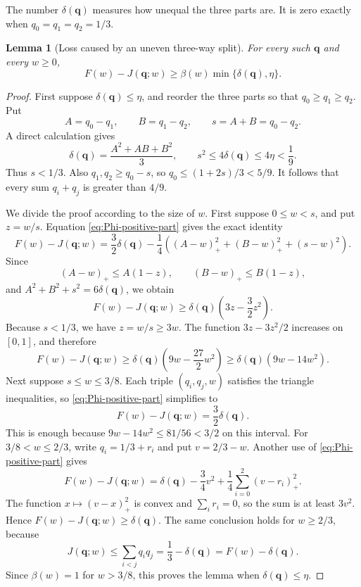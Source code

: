 \documentclass[11pt]{article}
\numberwithin{equation}{section}
\newtheorem{lemma}[lemma]{Lemma}
\theoremstyle{remark}
\begin{document}
The number $\delta(\mathbf q)$ measures how unequal the three parts are.  It is
zero exactly when $q_0=q_1=q_2=1/3$.
\begin{lemma}[Loss caused by an uneven three-way split]
\label{lem:uneven-three-split}
For every such $\mathbf q$ and every $w\ge0$,
\begin{equation}\label{eq:uneven-three-split}
 F(w)-J(\mathbf q;w)
 \ge \beta(w)\min\{\delta(\mathbf q),\eta\}.
\end{equation}
\end{lemma}
\begin{proof}
First suppose $\delta(\mathbf q)\le\eta$, and reorder the three parts so that
$q_0\ge q_1\ge q_2$.  Put
\[
 A=q_0-q_1,
 \qquad B=q_1-q_2,
 \qquad s=A+B=q_0-q_2.
\]
A direct calculation gives
\begin{equation}\label{eq:delta-AB}
 \delta(\mathbf q)=\frac{A^2+AB+B^2}{3},
 \qquad
 s^2\le4\delta(\mathbf q)\le4\eta<\frac19.
\end{equation}
Thus $s<1/3$.  Also $q_1,q_2\ge q_0-s$, so
$q_0\le(1+2s)/3<5/9$.  It follows that every sum $q_i+q_j$ is greater
than $4/9$.

We divide the proof according to the size of $w$.  First suppose
$0\le w<s$, and put $z=w/s$.  Equation
\eqref{eq:Phi-positive-part} gives the exact identity
\begin{equation}\label{eq:small-w-exact}
 F(w)-J(\mathbf q;w)
 =\frac32\delta(\mathbf q)
 -\frac14\left((A-w)_+^2+(B-w)_+^2+(s-w)^2\right).
\end{equation}
Since
\[
 (A-w)_+\le A(1-z),
 \qquad
 (B-w)_+\le B(1-z),
\]
and $A^2+B^2+s^2=6\delta(\mathbf q)$, we obtain
\[
 F(w)-J(\mathbf q;w)
 \ge\delta(\mathbf q)\left(3z-\frac32z^2\right).
\]
Because $s<1/3$, we have $z=w/s\ge3w$.  The function
$3z-3z^2/2$ increases on $[0,1]$, and therefore
\[
 F(w)-J(\mathbf q;w)
 \ge\delta(\mathbf q)\left(9w-\frac{27}{2}w^2\right)
 \ge\delta(\mathbf q)(9w-14w^2).
\]
Next suppose $s\le w\le3/8$.  Each triple $(q_i,q_j,w)$ satisfies the
triangle inequalities, so \eqref{eq:Phi-positive-part} simplifies to
\begin{equation}\label{eq:middle-w-three}
 F(w)-J(\mathbf q;w)=\frac32\delta(\mathbf q).
\end{equation}
This is enough because $9w-14w^2\le81/56<3/2$ on this interval.
For $3/8<w\le2/3$, write $q_i=1/3+r_i$ and put $v=2/3-w$.
Another use of \eqref{eq:Phi-positive-part} gives
\begin{equation}\label{eq:large-w-three}
 F(w)-J(\mathbf q;w)
 =\delta(\mathbf q)-\frac34v^2
 +\frac14\sum_{i=0}^2(v-r_i)_+^2.
\end{equation}
The function $x\mapsto(v-x)_+^2$ is convex and $\sum_i r_i=0$, so the
sum is at least $3v^2$.  Hence
$F(w)-J(\mathbf q;w)\ge\delta(\mathbf q)$.  The same conclusion holds for $w\ge2/3$,
because
\[
 J(\mathbf q;w)\le\sum_{i<j}q_iq_j
 =\frac13-\delta(\mathbf q)=F(w)-\delta(\mathbf q).
\]
Since $\beta(w)=1$ for $w>3/8$, this proves the lemma when
$\delta(\mathbf q)\le\eta$.


\end{proof}
\end{document}
